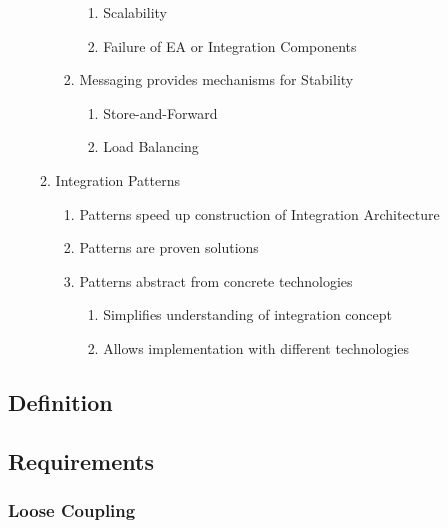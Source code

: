 \documentclass[
     12pt,         %
     a4paper,      %
     BCOR10mm,     %
     DIV14,        %
aragraph skip instad of paragraph indent
     ]{scrreprt}
\begin{document}
\begin{enumerate}
\begin{enumerate}
\begin{enumerate}
\begin{enumerate}
                                      \item Scalability
                                      \item Failure of EA or Integration Components
                                 \end{enumerate}
                           \item Messaging provides mechanisms for Stability
                                 \begin{enumerate}
                                      \item Store-and-Forward
                                      \item Load Balancing
                                 \end{enumerate}
                      \end{enumerate}
                \item Integration Patterns
                      \begin{enumerate}
                           \item Patterns speed up construction of Integration Architecture
                           \item Patterns are proven solutions
                           \item Patterns abstract from concrete technologies
                                 \begin{enumerate}
                                      \item Simplifies understanding of integration concept
                                      \item Allows implementation with different technologies
                                 \end{enumerate}
                      \end{enumerate}
           \end{enumerate}
\end{enumerate}

\subsection{Definition}

\subsection{Requirements}

\subsubsection{Loose Coupling}
\end{document}
